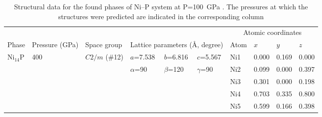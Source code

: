 \documentclass[twoside,twocolumn,9pt]{article}
\begin{document}
\begin{table}[t]
\small
  \caption{{\color{blue} Structural data for the found phases of Ni--P system at P=100~GPa . The pressures at which the structures were predicted are indicated in the corresponding column}
}
  \label{tbl:new_phases}
  \begin{tabular*}{\textwidth}{@{\extracolsep{\fill}}llllllllll}
    \hline
    \multicolumn{6}{c}{} & \multicolumn{4}{c}{Atomic coordinates}\\\cline{7-10}
    Phase & Pressure (GPa) & Space group & \multicolumn{3}{c}{Lattice parameters (\AA, degree)}  & Atom & $x$ & $y$ & $z$\\
    \midrule
    Ni$_{14}$P & 400 & $C2/m$ (\#12) & $a$=7.538    & $b$=6.816   & $c$=5.567       & Ni1 & 0.000 & 0.169 & 0.000 \\
               &     &               & $\alpha$=90      & $\beta$=120 & $\gamma$=90        & Ni2 & 0.099 & 0.000 & 0.397 \\    
               &     &               &                  &                 &                  & Ni3 & 0.301 & 0.000 & 0.198 \\
               &     &               &                  &                 &                  & Ni4 & 0.703 & 0.335 & 0.800 \\
               &     &               &                  &                 &                  & Ni5 & 0.599 & 0.166 & 0.398 \\

\end{tabular*}
\end{table}
\end{document}
